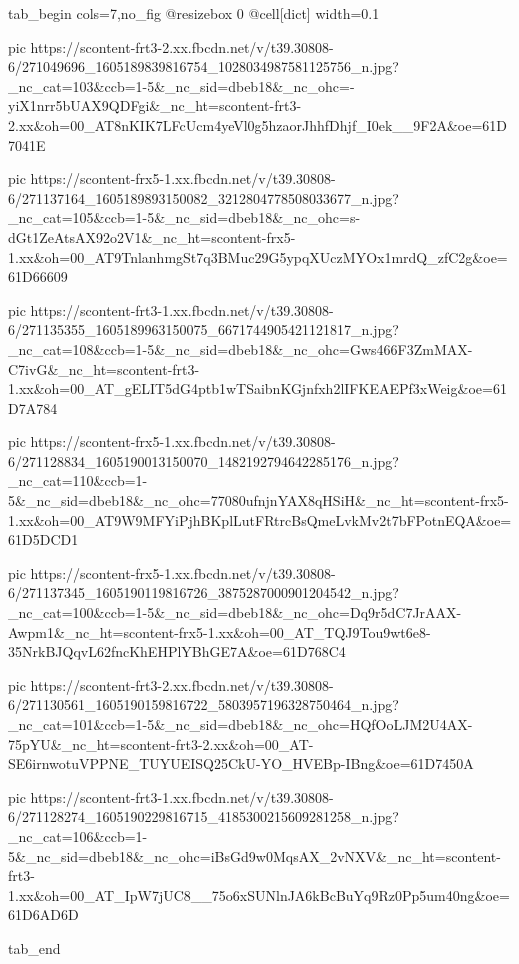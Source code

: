  
 
 
 
 

\begin{center}
\end{center}

\ifcmt
  tab_begin cols=7,no_fig
     @resizebox 0
		 @cell[dict] width=0.1

     pic https://scontent-frt3-2.xx.fbcdn.net/v/t39.30808-6/271049696_1605189839816754_1028034987581125756_n.jpg?_nc_cat=103&ccb=1-5&_nc_sid=dbeb18&_nc_ohc=-yiX1nrr5bUAX9QDFgi&_nc_ht=scontent-frt3-2.xx&oh=00_AT8nKIK7LFcUcm4yeVl0g5hzaorJhhfDhjf_I0ek__9F2A&oe=61D7041E

     pic https://scontent-frx5-1.xx.fbcdn.net/v/t39.30808-6/271137164_1605189893150082_3212804778508033677_n.jpg?_nc_cat=105&ccb=1-5&_nc_sid=dbeb18&_nc_ohc=s-dGt1ZeAtsAX92o2V1&_nc_ht=scontent-frx5-1.xx&oh=00_AT9TnlanhmgSt7q3BMuc29G5ypqXUczMYOx1mrdQ_zfC2g&oe=61D66609

     pic https://scontent-frt3-1.xx.fbcdn.net/v/t39.30808-6/271135355_1605189963150075_6671744905421121817_n.jpg?_nc_cat=108&ccb=1-5&_nc_sid=dbeb18&_nc_ohc=Gws466F3ZmMAX-C7ivG&_nc_ht=scontent-frt3-1.xx&oh=00_AT_gELIT5dG4ptb1wTSaibnKGjnfxh2lIFKEAEPf3xWeig&oe=61D7A784

     pic https://scontent-frx5-1.xx.fbcdn.net/v/t39.30808-6/271128834_1605190013150070_1482192794642285176_n.jpg?_nc_cat=110&ccb=1-5&_nc_sid=dbeb18&_nc_ohc=77080ufnjnYAX8qHSiH&_nc_ht=scontent-frx5-1.xx&oh=00_AT9W9MFYiPjhBKplLutFRtrcBsQmeLvkMv2t7bFPotnEQA&oe=61D5DCD1

    pic https://scontent-frx5-1.xx.fbcdn.net/v/t39.30808-6/271137345_1605190119816726_3875287000901204542_n.jpg?_nc_cat=100&ccb=1-5&_nc_sid=dbeb18&_nc_ohc=Dq9r5dC7JrAAX-Awpm1&_nc_ht=scontent-frx5-1.xx&oh=00_AT_TQJ9Tou9wt6e8-35NrkBJQqvL62fncKhEHPlYBhGE7A&oe=61D768C4
    
    pic https://scontent-frt3-2.xx.fbcdn.net/v/t39.30808-6/271130561_1605190159816722_5803957196328750464_n.jpg?_nc_cat=101&ccb=1-5&_nc_sid=dbeb18&_nc_ohc=HQfOoLJM2U4AX-75pYU&_nc_ht=scontent-frt3-2.xx&oh=00_AT-SE6irnwotuVPPNE_TUYUEISQ25CkU-YO_HVEBp-IBng&oe=61D7450A

    pic https://scontent-frt3-1.xx.fbcdn.net/v/t39.30808-6/271128274_1605190229816715_4185300215609281258_n.jpg?_nc_cat=106&ccb=1-5&_nc_sid=dbeb18&_nc_ohc=iBsGd9w0MqsAX_2vNXV&_nc_ht=scontent-frt3-1.xx&oh=00_AT_IpW7jUC8__75o6xSUNlnJA6kBcBuYq9Rz0Pp5um40ng&oe=61D6AD6D

  tab_end
\fi

